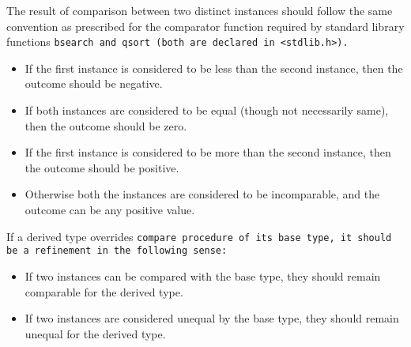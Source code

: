 The result of comparison between two distinct instances should follow the same
convention as prescribed for the comparator function required by standard library
functions \tt{bsearch} and \tt{qsort} (both are declared in \tt{<stdlib.h>}).

\begin{itemize}[nosep]

\item If the first instance is considered to be less than
the second instance, then the outcome should be negative.

\item If both instances are considered to be equal (though
not necessarily same), then the outcome should be zero.

\item If the first instance is considered to be more than
the second instance, then the outcome should be positive.

\item Otherwise both the instances are considered to be
incomparable, and the outcome can be any positive value.

\end{itemize}

\vspace{\baselineskip}

If a derived type overrides \tt{compare} procedure of its base type,
it should be a refinement in the following sense:

\begin{itemize}[nosep]

\item If two instances can be compared with the base type,
they should remain comparable for the derived type.

\item If two instances are considered unequal by the base type,
they should remain unequal for the derived type.

\end{itemize}
